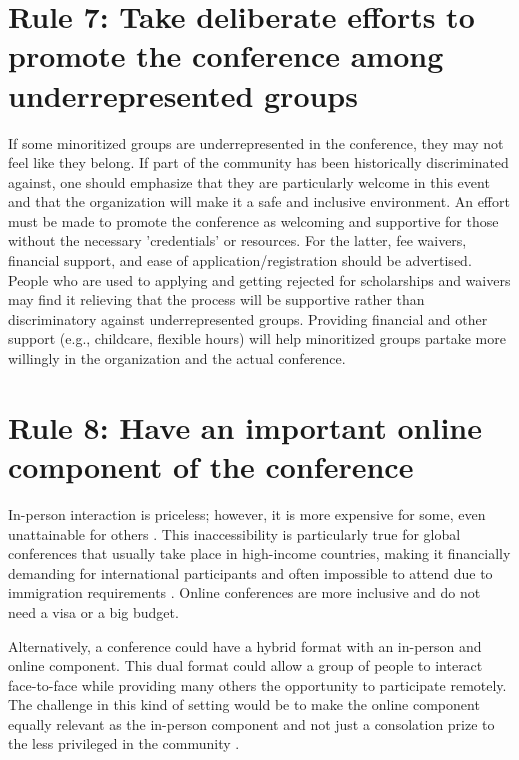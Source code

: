 \documentclass[10pt,letterpaper]{article}
\begin{document}
\section*{Rule 7: Take deliberate efforts to promote the conference among underrepresented groups}

If some minoritized groups are underrepresented in the conference, they may not feel like they belong. 
If part of the community has been historically discriminated against, one should emphasize that they are particularly welcome in this event and that the organization will make it a safe and inclusive environment. 
An effort must be made to promote the conference as welcoming and supportive for those without the necessary 'credentials' or resources. For the latter, fee waivers, financial support, and ease of application/registration should be advertised. People who are used to applying and getting rejected for scholarships and waivers may find it relieving that the process will be supportive rather than discriminatory against underrepresented groups. Providing financial and other support (e.g., childcare, flexible hours) will help minoritized groups partake more willingly in the organization and the actual conference.

\section*{Rule 8: Have an important online component of the conference} 

In-person interaction is priceless; however, it is more expensive for some, even unattainable for others \cite{arend_disparity_2019, timperley_he_2020, niner_better_2021}. This inaccessibility is particularly true for global conferences that usually take place in high-income countries, making it financially demanding for international participants and often impossible to attend due to immigration requirements \cite{sarabipour_evaluating_2020, gewin_what_2019}. Online conferences are more inclusive and do not need a visa or a big budget.

Alternatively, a conference could have a hybrid format with an in-person and online component. This dual format could allow a group of people to interact face-to-face while providing many others the opportunity to participate remotely. The challenge in this kind of setting would be to make the online component equally relevant as the in-person component and not just a consolation prize to the less privileged in the community \cite{niner_better_2021}. 
\end{document}
